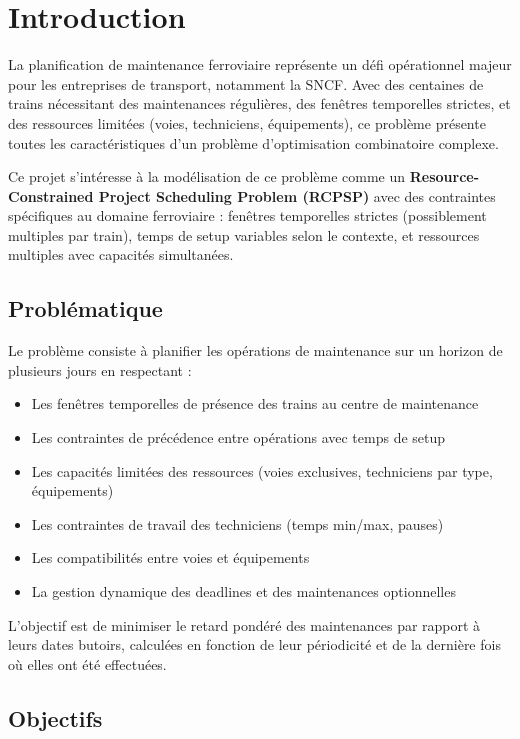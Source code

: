 \section{Introduction}

La planification de maintenance ferroviaire représente un défi opérationnel majeur pour les entreprises de transport, notamment la SNCF. Avec des centaines de trains nécessitant des maintenances régulières, des fenêtres temporelles strictes, et des ressources limitées (voies, techniciens, équipements), ce problème présente toutes les caractéristiques d'un problème d'optimisation combinatoire complexe.

Ce projet s'intéresse à la modélisation de ce problème comme un \textbf{Resource-Constrained Project Scheduling Problem (RCPSP)} avec des contraintes spécifiques au domaine ferroviaire : fenêtres temporelles strictes (possiblement multiples par train), temps de setup variables selon le contexte, et ressources multiples avec capacités simultanées.

\subsection{Problématique}

Le problème consiste à planifier les opérations de maintenance sur un horizon de plusieurs jours en respectant :
\begin{itemize}
	\item Les fenêtres temporelles de présence des trains au centre de maintenance
	\item Les contraintes de précédence entre opérations avec temps de setup
	\item Les capacités limitées des ressources (voies exclusives, techniciens par type, équipements)
	\item Les contraintes de travail des techniciens (temps min/max, pauses)
	\item Les compatibilités entre voies et équipements
	\item La gestion dynamique des deadlines et des maintenances optionnelles
\end{itemize}

L'objectif est de minimiser le retard pondéré des maintenances par rapport à leurs dates butoirs, calculées en fonction de leur périodicité et de la dernière fois où elles ont été effectuées.

\subsection{Objectifs}

